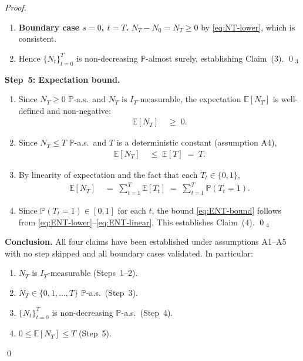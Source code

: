 \documentclass[12pt,openany]{book}
\numberwithin{equation}{chapter}
\theoremstyle{plain}
\theoremstyle{definition}
\theoremstyle{remark}
\def\mathcal#1{#1}%
\begin{document}
\begin{proof}
\begin{enumerate}
  \item \textbf{Boundary case $s = 0$, $t = T$.}
        $N_T - N_0 = N_T \geq 0$ by \eqref{eq:NT-lower},
        which is consistent.

  \item Hence $\{N_t\}_{t=0}^{T}$ is non-decreasing
        $\mathbb{P}$-almost surely, establishing Claim~(3).
        \qed$_3$
\end{enumerate}

\medskip
\noindent\textbf{Step~5: Expectation bound.}
\begin{enumerate}
  \item Since $N_T \geq 0$ $\mathbb{P}$-a.s.\ and $N_T$ is
        $\mathcal{I}_T$-measurable, the expectation $\mathbb{E}[N_T]$
        is well-defined and non-negative:
        \begin{align}
          \mathbb{E}[N_T] &\;\geq\; 0.
          \label{eq:ENT-lower}
        \end{align}

  \item Since $N_T \leq T$ $\mathbb{P}$-a.s.\ and $T$ is a
        deterministic constant (assumption A4),
        \begin{align}
          \mathbb{E}[N_T]
          &\;\leq\; \mathbb{E}[T] \;=\; T.
          \label{eq:ENT-upper}
        \end{align}

  \item By linearity of expectation and the fact that each
        $T_t \in \{0,1\}$,
        \begin{align}
          \mathbb{E}[N_T]
          &\;=\; \sum_{t=1}^{T} \mathbb{E}[T_t]
          \;=\; \sum_{t=1}^{T} \mathbb{P}(T_t = 1).
          \label{eq:ENT-linear}
        \end{align}

  \item Since $\mathbb{P}(T_t = 1) \in [0,1]$ for each $t$, the
        bound \eqref{eq:ENT-bound} follows from
        \eqref{eq:ENT-lower}--\eqref{eq:ENT-linear}.
        This establishes Claim~(4). \qed$_4$
\end{enumerate}

\medskip
\noindent\textbf{Conclusion.}
All four claims have been established under assumptions A1--A5
with no step skipped and all boundary cases validated.  In
particular:
\begin{enumerate}
  \item $N_T$ is $\mathcal{I}_T$-measurable (Steps~1--2).
  \item $N_T \in \{0,1,\ldots,T\}$ $\mathbb{P}$-a.s.\ (Step~3).
  \item $\{N_t\}_{t=0}^{T}$ is non-decreasing
        $\mathbb{P}$-a.s.\ (Step~4).
  \item $0 \leq \mathbb{E}[N_T] \leq T$ (Step~5).
\end{enumerate}
\qed
\end{proof}
\end{document}
